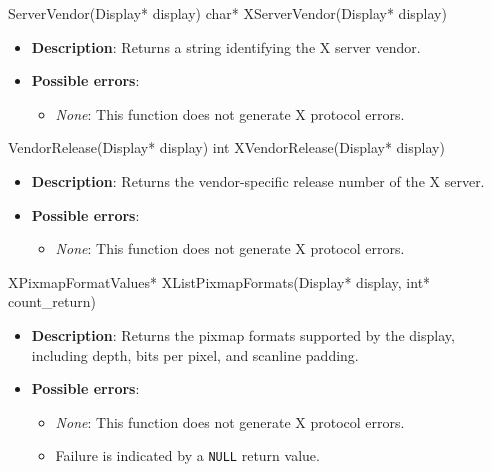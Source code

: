 \documentclass{report}
\begin{document}
\begin{itemize}
        \begin{cppcode}
            ServerVendor(Display* display)
            char* XServerVendor(Display* display)
        \end{cppcode}
        \begin{itemize}
            \item \textbf{Description}: Returns a string identifying the X server vendor.
            \item \textbf{Possible errors}:
                \begin{itemize}
                    \item \textit{None}: This function does not generate X protocol errors.
                \end{itemize}
        \end{itemize}

        \begin{cppcode}
            VendorRelease(Display* display)
            int XVendorRelease(Display* display)
        \end{cppcode}
        \begin{itemize}
            \item \textbf{Description}: Returns the vendor-specific release number of the X server.
            \item \textbf{Possible errors}:
                \begin{itemize}
                    \item \textit{None}: This function does not generate X protocol errors.
                \end{itemize}
        \end{itemize}

        \begin{cppcode}
            XPixmapFormatValues* XListPixmapFormats(Display* display, int* count_return)
        \end{cppcode}
        \begin{itemize}
            \item \textbf{Description}: Returns the pixmap formats supported by the display, including depth, bits per pixel, and scanline padding.
            \item \textbf{Possible errors}:
                \begin{itemize}
                    \item \textit{None}: This function does not generate X protocol errors.
                    \item Failure is indicated by a \texttt{NULL} return value.
                \end{itemize}
        \end{itemize}


\end{itemize}
\end{document}

